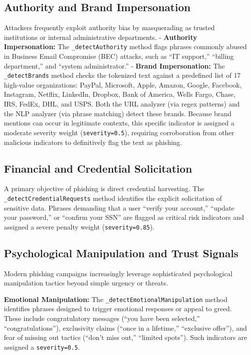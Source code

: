\subsection{Authority and Brand
Impersonation}\label{authority-and-brand-impersonation}

Attackers frequently exploit authority bias by masquerading as trusted
institutions or internal administrative departments. - \textbf{Authority
Impersonation:} The \texttt{\_detectAuthority} method flags phrases
commonly abused in Business Email Compromise (BEC) attacks, such as ``IT
support,'' ``billing department,'' and ``system administrator.'' -
\textbf{Brand Impersonation:} The \texttt{\_detectBrands} method checks
the tokenized text against a predefined list of 17 high-value
organizations: PayPal, Microsoft, Apple, Amazon, Google, Facebook,
Instagram, Netflix, LinkedIn, Dropbox, Bank of America, Wells Fargo,
Chase, IRS, FedEx, DHL, and USPS. Both the URL analyzer (via regex
patterns) and the NLP analyzer (via phrase matching) detect these
brands. Because brand mentions can occur in legitimate contexts, this
specific indicator is assigned a moderate severity weight
(\texttt{severity=0.5}), requiring corroboration from other malicious
indicators to definitively flag the text as phishing.

\subsection{Financial and Credential
Solicitation}\label{financial-and-credential-solicitation}

A primary objective of phishing is direct credential harvesting. The
\texttt{\_detectCredentialRequests} method identifies the explicit
solicitation of sensitive data. Phrases demanding that a user ``verify
your account,'' ``update your password,'' or ``confirm your SSN'' are
flagged as critical risk indicators and assigned a severe penalty weight
(\texttt{severity=0.85}).

\subsection{Psychological Manipulation and Trust Signals}\label{psychological-manipulation-and-trust-signals}

Modern phishing campaigns increasingly leverage sophisticated
psychological manipulation tactics beyond simple urgency or threats.

\textbf{Emotional Manipulation:} The \texttt{\_detectEmotionalManipulation}
method identifies phrases designed to trigger emotional responses or appeal
to greed. These include congratulatory messages (``you have been selected,''
``congratulations''), exclusivity claims (``once in a lifetime,'' ``exclusive
offer''), and fear of missing out tactics (``don't miss out,'' ``limited
spots''). Such indicators are assigned a \texttt{severity=0.5}.

